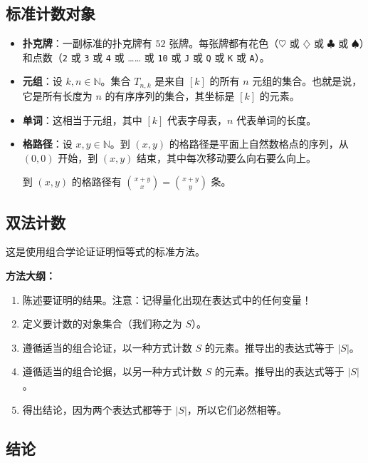 \subsection{标准计数对象}

\begin{itemize}
    \item \textbf{扑克牌}：一副标准的扑克牌有 $52$ 张牌。每张牌都有花色（$\heartsuit$ 或 $\diamondsuit$ 或 $\clubsuit$ 或 $\spadesuit$）和点数（\verb|2| 或 \verb|3| 或 \verb|4| 或 …… 或 \verb|10| 或 \verb|J| 或 \verb|Q| 或 \verb|K| 或 \verb|A|）。
    \item \textbf{元组}：设 $k, n \in \mathbb{N}$。集合 $T_{n,k}$ 是来自 $[k]$ 的所有 $n$ 元组的集合。也就是说，它是所有长度为 $n$ 的有序序列的集合，其坐标是 $[k]$ 的元素。
    \item \textbf{单词}：这相当于元组，其中 $[k]$ 代表字母表，$n$ 代表单词的长度。
    \item \textbf{格路径}：设 $x, y \in \mathbb{N}$。到 $(x, y)$ 的格路径是平面上自然数格点的序列，从 $(0, 0)$ 开始，到 $(x, y)$ 结束，其中每次移动要么向右要么向上。

          到 $(x, y)$ 的格路径有 ${x+y \choose x} = {x+y \choose y}$ 条。
\end{itemize}


\subsection{双法计数}

这是使用组合学论证证明恒等式的标准方法。

\textbf{方法大纲：}

\begin{enumerate}
    \item 陈述要证明的结果。注意：记得量化出现在表达式中的任何变量！
    \item 定义要计数的对象集合（我们称之为 $S$）。
    \item 遵循适当的组合论证，以一种方式计数 $S$ 的元素。推导出的表达式等于 $|S|$。
    \item 遵循适当的组合论据，以另一种方式计数 $S$ 的元素。推导出的表达式等于 $|S|$。
    \item 得出结论，因为两个表达式都等于 $|S|$，所以它们必然相等。
\end{enumerate}


\subsection{结论}

